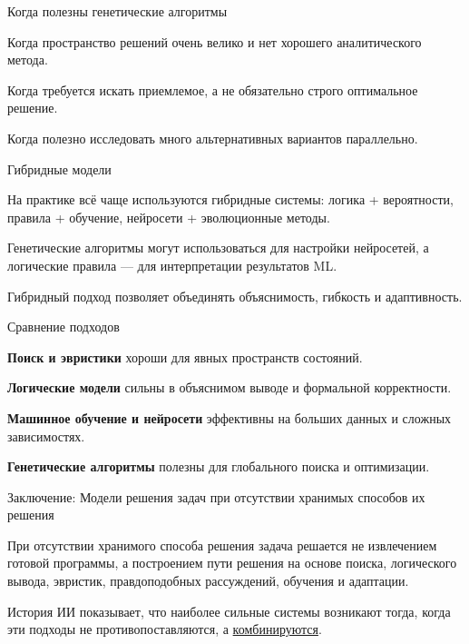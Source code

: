 \begin{frame}{Когда полезны генетические алгоритмы}
	\topline
	\justifying
	
	\begin{textitemize}
		\item Когда пространство решений очень велико и нет хорошего аналитического метода.
		\item Когда требуется искать приемлемое, а не обязательно строго оптимальное решение.
		\item Когда полезно исследовать много альтернативных вариантов параллельно.
	\end{textitemize}
\end{frame}

\begin{frame}{Гибридные модели}
	\topline
	\justifying
	
	\begin{textitemize}
		\item На практике всё чаще используются гибридные системы: логика + вероятности, правила + обучение, нейросети + эволюционные методы.
		\item Генетические алгоритмы могут использоваться для настройки нейросетей, а логические правила --- для интерпретации результатов ML.
		\item Гибридный подход позволяет объединять объяснимость, гибкость и адаптивность.
	\end{textitemize}
\end{frame}

\begin{frame}{Сравнение подходов}
	\topline
	\justifying
	
	\begin{textitemize}
		\item \textbf{Поиск и эвристики} хороши для явных пространств состояний.
		\item \textbf{Логические модели} сильны в объяснимом выводе и формальной корректности.
		\item \textbf{Машинное обучение и нейросети} эффективны на больших данных и сложных зависимостях.
		\item \textbf{Генетические алгоритмы} полезны для глобального поиска и оптимизации.
	\end{textitemize}
\end{frame}

\begin{frame}{Заключение: Модели решения задач при отсутствии хранимых способов их решения}
	\topline
	\justifying
	
	При отсутствии хранимого способа решения задача решается не извлечением готовой программы, а построением пути решения на основе поиска, логического вывода, эвристик, правдоподобных рассуждений, обучения и адаптации. 
	
	\bigskip
	
	История ИИ показывает, что наиболее сильные системы возникают тогда, когда эти подходы не противопоставляются, а \uline{комбинируются}.
\end{frame}

